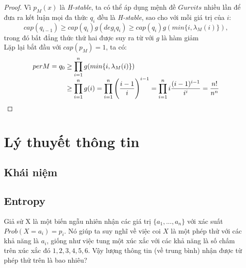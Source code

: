\documentclass[a4paper, 12pt]{report}
\begin{document}
\begin{proof}
Vì $p_M(x)$ là \textit{H-stable}, ta có thể áp dụng mệnh đề $Gurvits$ nhiều lần để đưa ra kết luận mọi đa thức $q_i$ đều là \textit{H-stable}, sao cho với mỗi giá trị của $i$:
\begin{equation}
	cap(q_{i-1}) \geq cap(q_i)g(deg_{i}q_i) \geq cap(q_i)g(min \{i, \lambda_{M}(i)\}), 
\end{equation}
trong đó bất đẳng thức thứ hai được suy ra từ với $g$ là hàm giảm\\ 
Lặp lại     bắt đầu với $cap(p_M) =1$, ta có:
\begin{equation*}
\begin{array}{l@{}l}
	per M 
	= q_0 &{}\geq \displaystyle \prod_{i=1}^{n} g(min \{i,\lambda_M(i) \} )\\
	&{}\geq \displaystyle \prod_{i=1}^{n}g(i) = \displaystyle \prod_{i=1}^{n} \Bigg( \frac{i-1}{i} \Bigg)^{i-1} = \displaystyle \prod_{i=1}^{n}i\frac{(i-1)^{i-1}}{i^i} = \frac{n!}{n^n}
\end{array}
\end{equation*}



\end{proof}

\chapter{Lý thuyết thông tin}
\section{Khái niệm}
\section{Entropy}
Giả sử X là một biến ngẫu nhiên nhận các giá trị $\{a_{1},...,a_{n}\}$ với xác suất $Prob(X=a_{i}) = p_{i}$. Nó giúp ta suy nghĩ về việc coi $X$ là một phép thử với các khả năng là $a_{i}$, giống như việc tung một xúc xắc với các khả năng là số chấm trên xúc xắc đó ${1,2,3,4,5,6}$. Vậy lượng thông tin (về trung bình) nhận được từ phép thử trên là bao nhiêu? 
\end{document}
